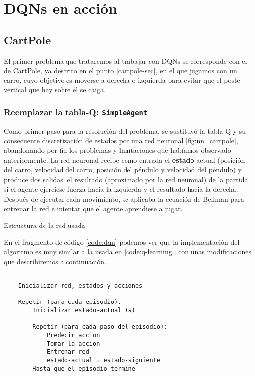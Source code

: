 \chapter{DQNs en acción}
\label{cap:dqnEnAccion}



\section{CartPole}
\label{sec:cartpoleDQN}

El primer problema que trataremos al trabajar con DQNs se corresponde con el de CartPole, ya descrito en el punto \ref{cartpole-sec}, en el que jugamos con un carro, cuyo objetivo es moverse a derecha o izquierda para evitar que el poste vertical que hay sobre él se caiga.


\subsection{Reemplazar la tabla-Q: \texttt{SimpleAgent}}
\label{sec:cartpoledqn1}

Como primer paso para la resolución del problema, se sustituyó la tabla-Q y su consecuente discretización de estados por una red neuronal \ref{fig:nn_cartpole}, abandonando por fin los problemas y limitaciones que habíamos observado anteriormente. La red neuronal recibe como entrada el \textbf{estado} actual (posición del carro, velocidad del carro, posición del péndulo y velocidad del péndulo) y produce dos salidas: el resultado (aproximado por la red neuronal) de la partida si el agente ejerciese fuerza hacia la izquierda y el resultado hacia la derecha. Después de ejecutar cada movimiento, se aplicaba la ecuación de Bellman para entrenar la red e intentar que el agente aprendiese a jugar.

%
       {Estructura de la red usada}

En el fragmento de código \ref{code:dqn} podemos ver que la implementación del algoritmo es muy similar a la usada en \ref{code:q-learning}, con unas modificaciones que describiremos a continuación.

\begin{minipage}{0.9\linewidth}%
    \begin{lstlisting}[frame=tb, caption=Pseudocódigo SimpleAgent, inputencoding=latin1, label=code:dqn]
    
    Inicializar red, estados y acciones
    
    Repetir (para cada episodio):
        Inicializar estado-actual (s)
        
        Repetir (para cada paso del episodio):
            Predecir accion
            Tomar la accion
            Entrenar red
            estado-actual = estado-siguiente
        Hasta que el episodio termine
    \end{lstlisting}%
\end{minipage}

